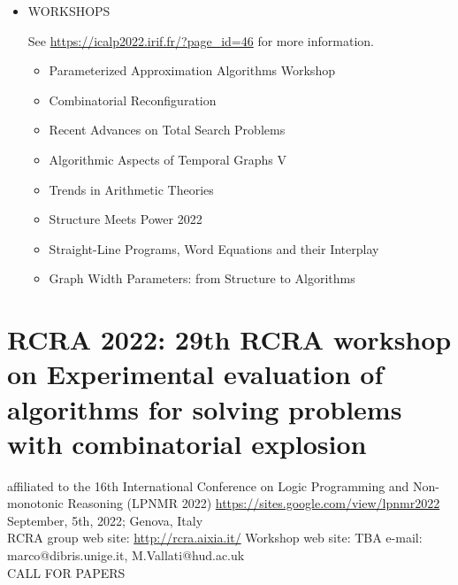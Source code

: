\documentclass[prodmode,acmtecs]{acmsmall} %
\begin{document}
\begin{itemize}
\item  WORKSHOPS  
 
  See \href{https://icalp2022.irif.fr/?page_id=46}{https://icalp2022.irif.fr/?page\_id=46} for more information. 
 
\begin{itemize}\item  Parameterized Approximation Algorithms Workshop 
\item  Combinatorial Reconfiguration 
\item  Recent Advances on Total Search Problems 
\item  Algorithmic Aspects of Temporal Graphs V 
\item  Trends in Arithmetic Theories 
\item  Structure Meets Power 2022 
\item  Straight-Line Programs, Word Equations and their Interplay 
\item  Graph Width Parameters: from Structure to Algorithms 
\end{itemize} 
\end{itemize}\section{RCRA 2022: 29th RCRA workshop on Experimental evaluation of algorithms for solving problems with combinatorial explosion }\label{RCRA2022}  affiliated to the 16th International Conference on Logic Programming and Non-monotonic Reasoning (LPNMR 2022) \href{https://sites.google.com/view/lpnmr2022}{https://sites.google.com/view/lpnmr2022} \\ 
  September, 5th, 2022; Genova, Italy \\ 
  RCRA group web site: \href{http://rcra.aixia.it/}{http://rcra.aixia.it/} Workshop web site: TBA e-mail: marco@dibris.unige.it, M.Vallati@hud.ac.uk\\ 
CALL FOR PAPERS 
\end{document}
